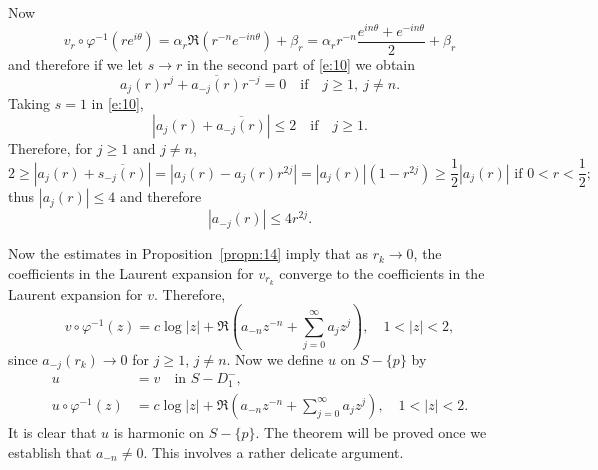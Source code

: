\documentclass[a4paper,11pt]{article}
\begin{document}
Now 
$$
v_r \circ \varphi^{-1}(re^{i\theta}) 
= \alpha_r \Re(r^{-n} e^{-in\theta}) + \beta_r 
= \alpha_r r^{-n} \frac{e^{in\theta} + e^{-in\theta}}{2} + \beta_r 
$$
and therefore if we let $s \to r$ in the second part of \eqref{e:10}
we obtain
$$
a_j(r) r^j + \overline{a_{-j}(r)} r^{-j} = 0
\quad\text{if}\quad j \ge 1,\ j \ne n.
$$
Taking $s=1$ in \eqref{e:10},
$$
|a_j(r) + \overline{a_{-j}(r)}| \le 2 \quad\text{if}\quad j\ge 1.
$$
Therefore, for $j \ge 1$ and $j \ne n$,
$$
2 \ge |a_j(r) + \overline{s_{-j}(r)}|
= |a_j(r) - a_j(r)r^{2j}|
= |a_j(r)|(1-r^{2j}) \ge \frac{1}{2}|a_j(r)|
\text{ if } 0 < r < \frac{1}{2};
$$
thus $|a_j(r)| \le 4$ and therefore
$$
|a_{-j}(r)| \le 4r^{2j}.
$$

Now the estimates in Proposition~\ref{propn:14} imply that as $r_k \to
0$, the coefficients in the Laurent expansion for $v_{r_k}$ converge
to the coefficients in the Laurent expansion for $v$.  Therefore,
$$
v\circ \varphi^{-1}(z) 
= c \log|z| + \Re(a_{-n}z^{-n} + \sum_{j=0}^{\infty} a_jz^j),\quad
1 < |z| < 2,
$$
since $a_{-j}(r_k) \to 0$ for $j \ge 1$, $j \ne n$.  Now we define $u$
on $S-\{p\}$ by
$$
\begin{aligned}
  u &= v \quad\text{in }S-D_1^-,\\
  u \circ \varphi^{-1}(z) 
  &= c\log|z| + \Re(a_{-n}z^{-n} + \sum_{j=0}^{\infty} a_jz^j),\quad
  1 < |z| < 2.
\end{aligned}
$$
It is clear that $u$ is harmonic on $S-\{p\}$.  The theorem will be
proved once we establish that $a_{-n} \ne 0$.  This involves a rather
delicate argument.
\end{document}
